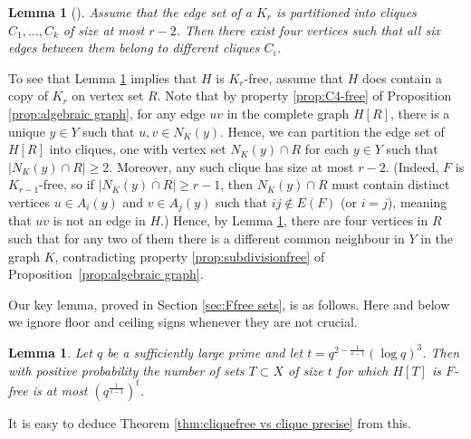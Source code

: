 \documentclass[11pt]{article}
\theoremstyle{plain}
\newtheorem{lemma}[theorem]{Lemma}
\theoremstyle{definition}
\begin{document}
\begin{lemma}[{\cite[Lemma 2.2]{Janzer_Sudakov}}] \label{lem:clique partition}
    Assume that the edge set of a $K_r$ is partitioned into cliques $C_1,\dots,C_k$ of size at most $r-2$. Then there exist four vertices such that all six edges between them belong to different cliques $C_i$.
\end{lemma}

To see that Lemma \ref{lem:clique partition} implies that $H$ is $K_r$-free, assume that $H$ does contain a copy of $K_r$ on vertex set $R$. Note that by property \ref{prop:C4-free} of Proposition \ref{prop:algebraic graph}, for any edge $uv$ in the complete graph $H[R]$, there is a unique $y\in Y$ such that $u,v\in N_K(y)$. Hence, we can partition the edge set of $H[R]$ into cliques, one with vertex set $N_K(y)\cap R$ for each $y\in Y$ such that $|N_K(y)\cap R|\geq 2$. Moreover, any such clique has size at most $r-2$. (Indeed, $F$ is $K_{r-1}$-free, so if $|N_K(y)\cap R|\geq r-1$, then $N_K(y)\cap R$ must contain distinct vertices $u\in A_i(y)$ and $v\in A_j(y)$ such that $ij\not \in E(F)$ (or $i=j$), meaning that $uv$ is not an edge in $H$.) Hence, by Lemma \ref{lem:clique partition}, there are four vertices in $R$ such that for any two of them there is a different common neighbour in $Y$ in the graph $K$, contradicting property \ref{prop:subdivisionfree} of Proposition~\ref{prop:algebraic graph}.

Our key lemma, proved in Section \ref{sec:Ffree sets}, is as follows. Here and below we ignore floor and ceiling signs whenever they are not crucial.

\begin{lemma} \label{lem:few F-free}
    Let $q$ be a sufficiently large prime and let $t=q^{2-\frac{1}{s-1}}(\log q)^{3}$. Then with positive probability the number of sets $T\subset X$ of size $t$ for which $H[T]$ is $F$-free is at most $(q^{\frac{1}{s-1}})^t$.
\end{lemma}

It is easy to deduce Theorem \ref{thm:cliquefree vs clique precise} from this.
\end{document}
